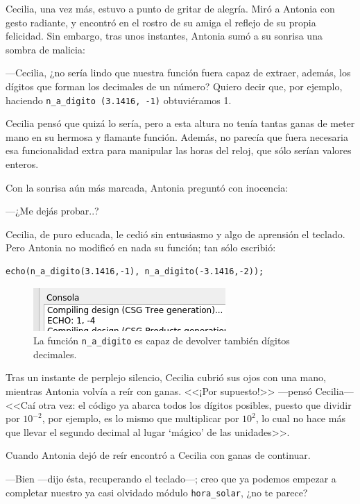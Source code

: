 Cecilia, una vez más, estuvo a punto de gritar de alegría. Miró a
Antonia con gesto radiante, y encontró en el rostro de su amiga el
reflejo de su propia felicidad. Sin embargo, tras unos instantes, Antonia sumó
a su sonrisa una sombra de malicia:

---Cecilia, ¿no sería lindo que nuestra función fuera capaz de
extraer, además, los dígitos que forman los decimales de un número?
Quiero decir que, por ejemplo, haciendo \lstinline!n_a_digito (3.1416, -1)!  obtuviéramos 1.

Cecilia pensó que quizá lo sería, pero a esta altura no tenía tantas
ganas de meter mano en su hermosa y flamante función. Además, no
parecía que fuera necesaria esa funcionalidad extra para manipular las
horas del reloj, que sólo serían valores enteros.

Con la sonrisa aún más marcada, Antonia preguntó con inocencia:

---¿Me dejás probar..?

Cecilia, de puro educada, le cedió sin entusiasmo y algo de aprensión
el teclado. Pero Antonia no modificó en nada su función; tan sólo
escribió:

\begin{lstlisting}[numbers=none]
echo(n_a_digito(3.1416,-1), n_a_digito(-3.1416,-2));
\end{lstlisting}

\begin{figure}[ht]
  \centering
\includegraphics[width=.6\textwidth]{imagenes/n-a-digito-2}  
\caption[Dígitos decimales.]{La función \lstinline!n_a_digito!  es
  capaz de devolver también dígitos decimales.}
  \label{fig:n-a-digito-2}
\end{figure}


Tras un instante de perplejo silencio, Cecilia cubrió sus ojos con una
mano, mientras Antonia volvía a reír con ganas. <<¡Por supuesto!>>
---pensó Cecilia--- <<Caí otra vez: el código ya abarca todos los dígitos
posibles, puesto que dividir por $10^{-2}$, por ejemplo, es lo mismo
que multiplicar por $10^2$, lo cual no hace más que llevar el segundo
decimal al lugar `mágico' de las unidades>>.

Cuando Antonia dejó de reír encontró a Cecilia con ganas de continuar.

---Bien ---dijo ésta, recuperando el teclado---; creo que ya podemos
empezar a completar nuestro ya casi olvidado módulo
\lstinline!hora_solar!, ¿no te parece?


